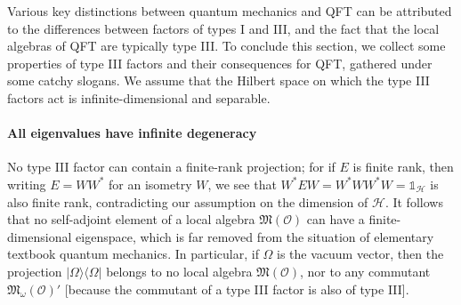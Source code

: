 \documentclass[12pt,a4paper]{article}
\newcommand{\1}{\mathds{1}}                         %
\newcommand{\Ocal}{\mathcal{O}}
\newcommand{\HH}{{\mathcal{H}}}
\newcommand{\Mf}{{\mathfrak{M}}}
\newcommand{\II}{{\mathbb{1}}}
\newcommand{\ket}[1]{|#1\rangle}
\newcommand{\bra}[1]{\langle #1|}
\begin{document}
Various key distinctions between quantum mechanics and QFT can be attributed to the differences between factors of types I and III, and the fact that the local algebras of QFT are typically type III. To conclude this section, we collect some properties of type III factors and their consequences for QFT, gathered under some catchy slogans. We assume that the Hilbert space on which the type III factors act is infinite-dimensional and separable. 

\paragraph{All eigenvalues have infinite degeneracy}
No type III factor can contain a finite-rank projection; for if $E$ 
is finite rank, then writing $E=WW^*$ for an isometry $W$, we see that 
$W^*EW=W^*WW^*W=\II_\HH$ is also finite rank, contradicting our assumption on the dimension of $\HH$.
It follows that no self-adjoint element of a local algebra $\Mf(\Ocal)$ can have a finite-dimensional eigenspace, which is far removed from the situation of elementary textbook quantum mechanics. In particular, if $\Omega$ is the vacuum vector,
then the projection $\ket{\Omega}\bra{\Omega}$ belongs to no local algebra $\Mf(\Ocal)$, nor to any commutant $\Mf_\omega(\Ocal)'$ [because the commutant of a type III factor is also of type III].
\end{document}
